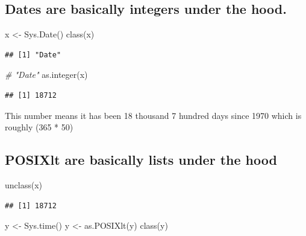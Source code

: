 \documentclass[
]{book}
\newenvironment{Shaded}{\begin{snugshade}}{\end{snugshade}}
\newcommand{\CommentTok}[1]{\textcolor[rgb]{0.56,0.35,0.01}{\textit{#1}}}
\newcommand{\FunctionTok}[1]{\textcolor[rgb]{0.00,0.00,0.00}{#1}}
\newcommand{\NormalTok}[1]{#1}
\newcommand{\OtherTok}[1]{\textcolor[rgb]{0.56,0.35,0.01}{#1}}
\begin{document}
\hypertarget{dates-are-basically-integers-under-the-hood.}{%
\subsection{Dates are basically integers under the hood.}\label{dates-are-basically-integers-under-the-hood.}}

\begin{Shaded}
\begin{Highlighting}[]
\NormalTok{x }\OtherTok{\textless{}{-}} \FunctionTok{Sys.Date}\NormalTok{()}
\FunctionTok{class}\NormalTok{(x)}
\end{Highlighting}
\end{Shaded}

\begin{verbatim}
## [1] "Date"
\end{verbatim}

\begin{Shaded}
\begin{Highlighting}[]
\CommentTok{\# "Date"}
\FunctionTok{as.integer}\NormalTok{(x)}
\end{Highlighting}
\end{Shaded}

\begin{verbatim}
## [1] 18712
\end{verbatim}

This number means it has been 18 thousand 7 hundred days since 1970 which is roughly (365 * 50)

\hypertarget{posixlt-are-basically-lists-under-the-hood}{%
\subsection{POSIXlt are basically lists under the hood}\label{posixlt-are-basically-lists-under-the-hood}}

\begin{Shaded}
\begin{Highlighting}[]
\FunctionTok{unclass}\NormalTok{(x)}
\end{Highlighting}
\end{Shaded}

\begin{verbatim}
## [1] 18712
\end{verbatim}

\begin{Shaded}
\begin{Highlighting}[]
\NormalTok{y }\OtherTok{\textless{}{-}} \FunctionTok{Sys.time}\NormalTok{()}
\NormalTok{y }\OtherTok{\textless{}{-}} \FunctionTok{as.POSIXlt}\NormalTok{(y)}
\FunctionTok{class}\NormalTok{(y)}
\end{Highlighting}
\end{Shaded}
\end{document}
